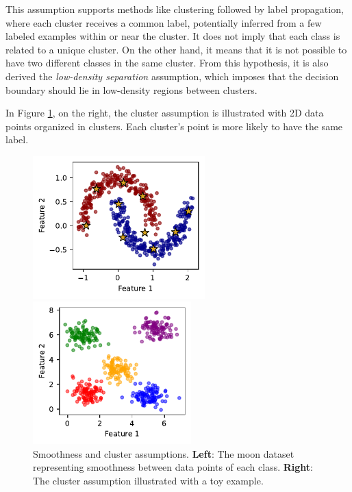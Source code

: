 This assumption supports methods like clustering followed by label propagation, 
where each cluster receives a common label, potentially inferred from a few 
labeled examples within or near the cluster.
It does not imply that each class is related to a unique cluster. 
On the other hand, it means that it is not possible to have two different classes 
in the same cluster.
From this hypothesis, it is also derived the \emph{low-density separation} 
assumption, which imposes that the decision boundary should lie in low-density
regions between clusters.

In Figure \ref{fig:moon_cluster}, on the right, the cluster assumption is 
illustrated with 2D data points organized in clusters. Each cluster's point is 
more likely to have the same label.
\begin{figure}[h]
    \centering
    \begin{minipage}{0.5\textwidth}
        \centering
        \includegraphics[height=5.5cm]{images/ssl/moon.pdf} %
    \end{minipage}\hfill
    \begin{minipage}{0.44\textwidth}
        \centering
        \includegraphics[height=5.5cm]{images/ssl/clusters.pdf} %
    \end{minipage}
    \caption{Smoothness and cluster assumptions. \textbf{Left}: The moon dataset representing smoothness between 
        data points of each class. \textbf{Right}: The cluster assumption 
        illustrated with a toy example.}
    \label{fig:moon_cluster}
    \end{figure}
